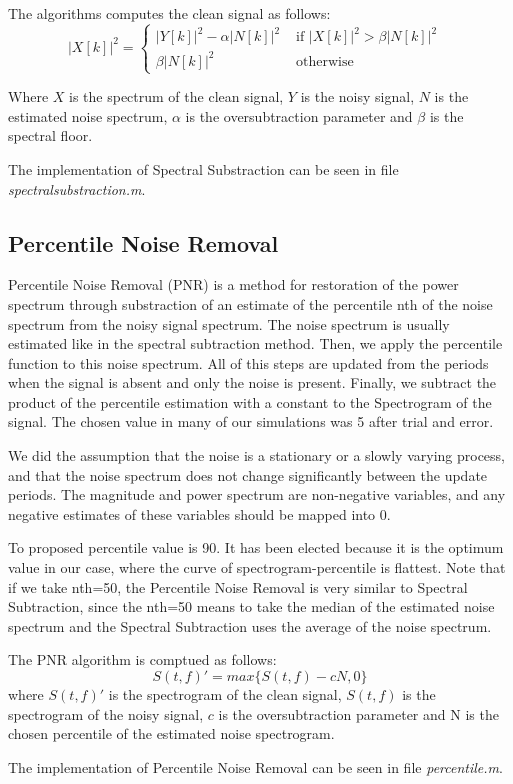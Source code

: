   The algorithms computes the clean signal as follows:
  \begin{dmath}
    |X[k]|^2 = \left\{  \begin{array}{rl}
      |Y[k]|^2-\alpha |N[k]|^2    &\mbox{ if  $|X[k]|^2>\beta |N[k]|^2$ } \\
      \beta |N[k]|^2   &\mbox{ otherwise } 
    \end{array} \right.
  \end{dmath}
  
  Where $X$ is the spectrum of the clean signal, $Y$ is the noisy signal, $N$ is the estimated noise spectrum, $\alpha$ is the oversubtraction parameter and $\beta$ is the spectral floor.
  
  The implementation of Spectral Substraction can be seen in file \emph{spectralsubstraction.m}\cite{spectralsubstraction.m}.

\subsection{Percentile Noise Removal}
  Percentile Noise Removal (PNR) is a method for restoration of the power spectrum through substraction of an estimate of the percentile nth of the noise spectrum from the noisy signal spectrum. The noise spectrum is usually estimated like in the spectral subtraction method. Then, we apply the percentile function to this noise spectrum. All of this steps are updated from the periods when the signal is absent and only the noise is present. Finally, we subtract the product of the percentile estimation with a constant to the Spectrogram of the signal. The chosen value in many of our simulations was 5 after trial and error.

  We did the assumption that the noise is a stationary or a slowly varying process, and that the noise spectrum does not change significantly between the update periods. The magnitude and power spectrum are non-negative variables, and any negative estimates of these variables should be mapped into 0. 

  To proposed percentile value is 90. It has been elected because it is the optimum value in our case, where the curve of spectrogram-percentile is flattest. Note that if we take nth=50, the Percentile Noise Removal is very similar to Spectral Subtraction, since the nth=50 means to take the median of the estimated noise spectrum and the Spectral Subtraction uses the average of the noise spectrum.
  
  The PNR algorithm is comptued as follows:
  \begin{dmath}
    S(t,f)'= max\{S(t,f)- c N,0\}
  \end{dmath}
  where $S(t,f)'$ is the spectrogram of the clean signal, $S(t,f)$ is the spectrogram of the noisy signal, $c$ is the oversubtraction parameter and N is the chosen percentile of the estimated noise spectrogram.
  
  The implementation of Percentile Noise Removal can be seen in file \emph{percentile.m}\cite{percentile.m}.

